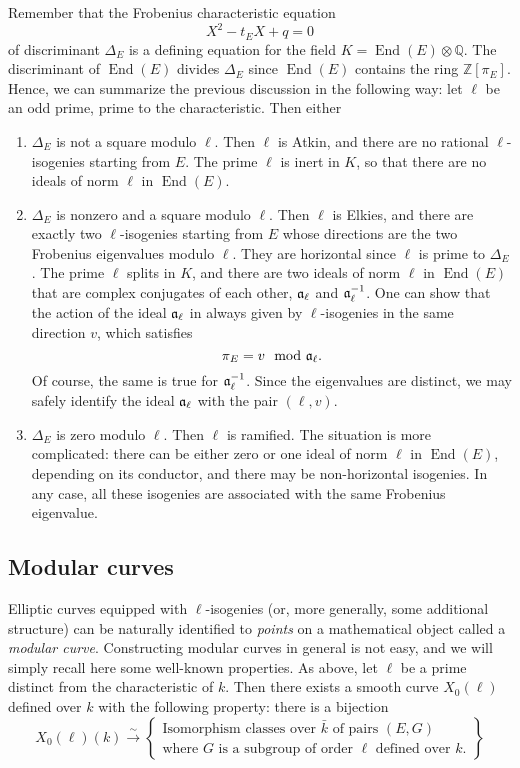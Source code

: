 \documentclass{article}
\newcommand{\Q}{\mathbb{Q}}
\newcommand{\Z}{\mathbb{Z}}
\newcommand{\isom}{\overset{\sim}{\longrightarrow}}
\newcommand{\set}[1]{\left\{#1\right\}}
\theoremstyle{definition}
\DeclareMathOperator{\End}{End}
\begin{document}
Remember that the Frobenius characteristic equation
\[
X^2 - t_E X + q = 0
\]
of discriminant $\Delta_E$ is a defining equation for the field $K = \End(E)
\otimes\Q$. The discriminant of $\End(E)$ divides $\Delta_E$ since $\End(E)$ 
contains the ring $\Z[\pi_E]$. Hence, we can summarize the previous discussion 
in the following way: let $\ell$ be an odd prime, prime to the characteristic. 
Then either
\begin{enumerate}
\item $\Delta_E$ is not a square modulo $\ell$. Then $\ell$ is Atkin, and there 
are no rational $\ell$-isogenies starting from $E$. The prime $\ell$ is inert 
in $K$, so that there are no ideals of norm $\ell$ in $\End(E)$.
\item $\Delta_E$ is nonzero and a square modulo $\ell$. Then $\ell$ is Elkies, 
and there are exactly two $\ell$-isogenies starting from $E$ whose directions 
are the two Frobenius eigenvalues modulo $\ell$. They are horizontal since $\ell
$ is prime to $\Delta_E$. The prime $\ell$ splits in $K$, and there are two 
ideals of norm $\ell$ in $\End(E)$ that are complex conjugates of each other, $
\frak a_\ell$ and $\frak a_\ell^{-1}$. One can show that the action of the 
ideal $\frak a_\ell$ in always given by $\ell$-isogenies in the same direction $
v$, which satisfies
\[
\pi_E = v \mod \frak a_\ell.
\]
Of course, the same is true for $\frak a_\ell^{-1}$. Since the eigenvalues are 
distinct, we may safely identify the ideal $\frak a_\ell$ with the pair $(\ell, 
v)$.
\item $\Delta_E$ is zero modulo $\ell$. Then $\ell$ is ramified. The situation 
is more complicated: there can be either zero or one ideal of norm $\ell$ in $
\End(E)$, depending on its conductor, and there may be non-horizontal 
isogenies. In any case, all these isogenies are associated with the same 
Frobenius eigenvalue.

\end{enumerate}


\subsection{Modular curves}

Elliptic curves equipped with $\ell$-isogenies (or, more generally, some 
additional structure) can be naturally identified to \emph{points} on a 
mathematical object called a \emph{modular curve}. Constructing modular curves 
in general is not easy, and we will simply recall here some well-known 
properties. As above, let $\ell$ be a prime distinct from the characteristic of 
$k$. 
Then there exists a smooth curve $X_0(\ell)$ defined over $k$ with the 
following property: there is a bijection
\[
X_0(\ell)(k) \isom \set{
\begin{matrix}
\text{Isomorphism classes over $\bar{k}$ of pairs $(E, G)$}\\
\text{where $G$ is a subgroup of order $\ell$ defined over $k$.}
\end{matrix}
}
\]
\end{document}
